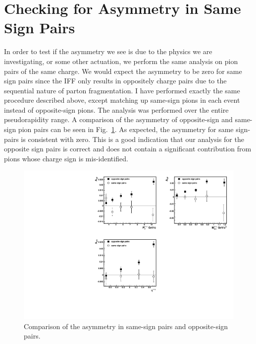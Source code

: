 \documentclass[letterpaper, abstract = on,listof=totoc, bibliography=totoc]{scrreprt}
\newcommand{\pip}{\pi^+}
\newcommand{\pim}{\pi^-}
\newcommand{\pair}{$\pip\pim$ }
\begin{document}
\section{Checking for Asymmetry in Same Sign Pairs}
In order to test if the asymmetry we see is due to the physics we are investigating, or some other actuation, we perform the same analysis on pion pairs of the same charge. We would expect the asymmetry to be zero for same sign pairs since the IFF only results in oppositely charge pairs due to the sequential nature of parton fragmentation.
%
I have performed exactly the same procedure described above, except matching up same-sign pions in each event instead of opposite-sign pions. The analysis was performed over the entire pseudorapidity range. A comparison of the asymmetry of opposite-sign and same-sign pion pairs can be seen in Fig.~\ref{fig:sameOppo}. As expected, the asymmetry for same sign-pairs is consistent with zero. This is a good indication that our analysis for the opposite sign pairs is correct and does not contain a significant contribution from pions whose charge sign is mis-identified. 

\begin{figure}
\begin{center}
\includegraphics[width = 1\textwidth]{sameOppoNewForThesis}
\caption[Asymmetry in \pair pairs when proton spin is randomly assigned]{Comparison of the asymmetry in same-sign pairs and opposite-sign pairs.}
\label{fig:sameOppo}
\end{center}
\end{figure}
\end{document}
